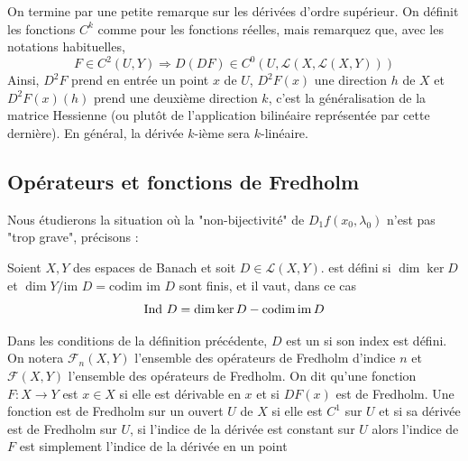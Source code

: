 \documentclass[memoire.tex]{subfiles}
\begin{document}
On termine par une petite remarque sur les dérivées d'ordre supérieur. On définit les fonctions $C^k$ comme pour les fonctions réelles, mais remarquez que, avec les notations habituelles,
\begin{equation*}
    F\in C^2(U,Y)\Rightarrow D(DF)\in C^0(U,\mathcal{L}(X,\mathcal{L}(X,Y)))
\end{equation*}
Ainsi, $D^2F$ prend en entrée un point $x$ de $U$, $D^2F(x)$ une direction $h$ de $X$ et  $D^2F(x)(h)$ prend une deuxième direction $k$, c'est la généralisation de la matrice Hessienne (ou plutôt de l'application bilinéaire représentée par cette dernière). En général, la dérivée $k$-ième sera $k$-linéaire.
\subsection{Opérateurs et fonctions de Fredholm}

Nous étudierons la situation où la "non-bijectivité" de $D_{1}f(x_0,\lambda_0)$ n'est pas "trop grave", précisons :
\begin{definition}
    Soient $X,Y$ des espaces de Banach et soit $D\in  \mathcal{L}(X,Y)$.  est défini si $\dim \ker D$ et $\dim  Y / \text{im } D=\text{codim } \text{im }D$ sont finis, et il vaut, dans ce cas
    \begin{equation*}
        \text{Ind }  D= \dim \ker D -\operatorname*{codim } \operatorname{im} D
    \end{equation*}

\end{definition}

\begin{definition}
    Dans les conditions de la définition précédente, $D$ est un  si son index est défini. On notera 
    $\mathcal{F}_n(X,Y)$  l'ensemble des opérateurs de Fredholm d'indice $n$ et $\mathcal{F}(X,Y)$ l'ensemble des opérateurs de Fredholm. On dit qu'une fonction $F: X\rightarrow Y$ est  $x\in X$ si elle est dérivable en $x$ et si $DF(x)$ est de Fredholm. Une fonction est de Fredholm sur un ouvert $U$ de $X$ si elle est $C^1$ sur $U$ et si sa dérivée est de Fredholm sur $U$, si l'indice de la dérivée est constant sur $U$ alors l'indice de $F$ est simplement l'indice de la dérivée en un point
\end{definition}
\end{document}
